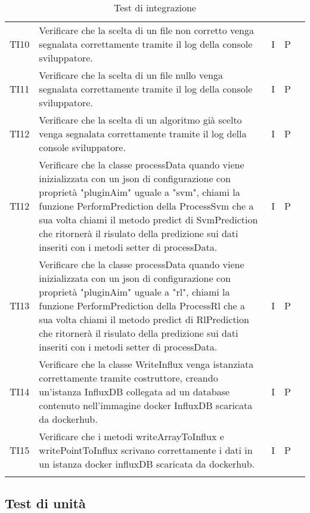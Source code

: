 \begin{longtable} {
		>{}p{15mm} 
		>{}p{79.5mm}
		>{}p{15mm} 
		>{}p{15mm}
		>{}p{0mm}}
	TI10      &  Verificare che la scelta di un file non corretto venga segnalata correttamente tramite il log della console sviluppatore.& I & P  &\TBstrut \\ [2mm]
	TI11      &  Verificare che la scelta di un file nullo venga segnalata correttamente tramite il log della console sviluppatore.& I & P  &\TBstrut \\ [2mm]
	TI12      &  Verificare che la scelta di un algoritmo già scelto venga segnalata correttamente tramite il log della console sviluppatore.& I & P  &\TBstrut \\ [2mm]

	TI12		& Verificare che la classe processData quando viene inizializzata con un json di configurazione con proprietà "pluginAim" uguale a "svm", chiami la funzione PerformPrediction della ProcessSvm che a sua volta chiami il metodo predict di SvmPrediction che ritornerà il risulato della predizione sui dati inseriti con i metodi setter di processData.& I & P &\TBstrut \\ [2mm]
	TI13		& Verificare che la classe processData quando viene inizializzata con un json di configurazione con proprietà "pluginAim" uguale a "rl", chiami la funzione PerformPrediction della ProcessRl che a sua volta chiami il metodo predict di RlPrediction che ritornerà il risulato della predizione sui dati inseriti con i metodi setter di processData.& I & P &\TBstrut \\ [2mm]
	TI14		& Verificare che la classe WriteInflux venga istanziata correttamente tramite costruttore, creando un'istanza InfluxDB collegata ad un database contenuto nell'immagine docker InfluxDB scaricata da dockerhub.& I & P &\TBstrut \\ [2mm]
	TI15	& Verificare che i metodi writeArrayToInflux e writePointToInflux scrivano correttamente i dati in un istanza docker influxDB scaricata da dockerhub.& I & P &\TBstrut \\ [2mm]
	
	\rowcolor{white}
	\caption{Test di integrazione}
\end{longtable}



\subsection{Test di unità}

